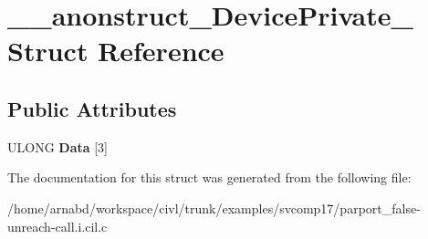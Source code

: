 \hypertarget{struct____anonstruct__DevicePrivate__30}{}\section{\+\_\+\+\_\+anonstruct\+\_\+\+Device\+Private\+\_ Struct Reference}
\label{struct____anonstruct__DevicePrivate__30}
\subsection*{Public Attributes}
\begin{DoxyCompactItemize}
\item 
\hypertarget{struct____anonstruct__DevicePrivate__30_a82d07d7f326cd0828a0c8bc6ee75bb8c}{}U\+L\+O\+N\+G {\bfseries Data} \mbox{[}3\mbox{]}\label{struct____anonstruct__DevicePrivate__30_a82d07d7f326cd0828a0c8bc6ee75bb8c}

\end{DoxyCompactItemize}


The documentation for this struct was generated from the following file\+:\begin{DoxyCompactItemize}
\item 
/home/arnabd/workspace/civl/trunk/examples/svcomp17/parport\+\_\+false-\/unreach-\/call.\+i.\+cil.\+c\end{DoxyCompactItemize}
